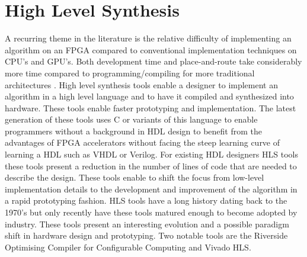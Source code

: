 

\chapter{High Level Synthesis}

A recurring theme in the literature is the relative difficulty of implementing an algorithm on an FPGA compared to conventional implementation techniques on CPU's and GPU's. Both development time and place-and-route take considerably more time compared to programming/compiling for more traditional architectures \cite{inta_chimera:_2012,tsoi_axel:_2010}.
High level synthesis tools enable a designer to implement an algorithm in a high level language and to have it compiled and synthesized into hardware. These tools enable faster prototyping and implementation\cite{che_accelerating_2008}. The latest generation of these tools uses C or variants of this language to enable programmers without a background in HDL design to benefit from the advantages of FPGA accelerators without facing the steep learning curve of learning a HDL such as VHDL or Verilog. For existing HDL designers HLS tools these tools present a reduction in the number of lines of code that are needed to describe the design\cite{casseau_c-_2005}.  These tools enable to shift the focus from low-level implementation details to the development and improvement of the algorithm in a rapid prototyping fashion\cite{wakabayashi_c-based_2004}.
HLS tools have a long history dating back to the 1970's but only recently have these tools matured enough to become adopted by industry. These tools present an interesting evolution and a possible paradigm shift in hardware design and prototyping\cite{cong_high-level_2011}.
Two notable tools are the Riverside Optimising Compiler for Configurable Computing and Vivado HLS.

